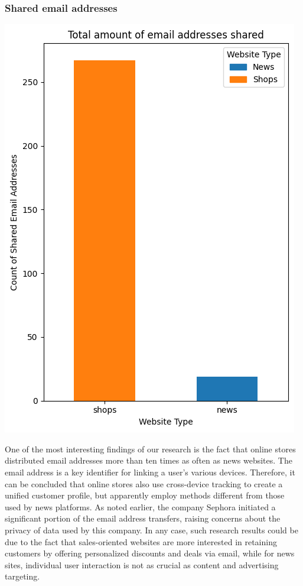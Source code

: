 \subsubsection{Shared email addresses}
\noindent 
\begin{minipage}{0.4\textwidth} 
    \includegraphics[width=\linewidth]{./assets/comparison3.png} 
\end{minipage}
\hfill 
\begin{minipage}{0.5\textwidth} 
    One of the most interesting findings of our research is the fact that online stores distributed email addresses more than ten times as often as news websites. The email address is a key identifier for linking a user's various devices. Therefore, it can be concluded that online stores also use cross-device tracking to create a unified customer profile, but apparently employ methods different from those used by news platforms. As noted earlier, the company Sephora initiated a significant portion of the email address transfers, raising concerns about the privacy of data used by this company. In any case, such research results could be due to the fact that sales-oriented websites are more interested in retaining customers by offering personalized discounts and deals via email, while for news sites, individual user interaction is not as crucial as content and advertising targeting.
\end{minipage}
\vspace{0.8cm}

